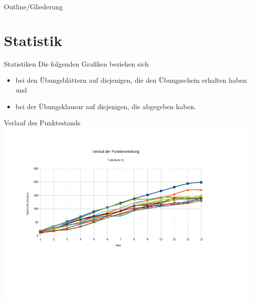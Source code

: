 
\subtitle{Foliensatz 14}
\date{7. Februar 2013}

\newcommand{\sq}{$\square$}
\newcommand{\da}{$\downarrow$}
\DeclareMathOperator{\cod}{cod}



\begin{frame}
    \titlepage
\end{frame}

\begin{frame}{Outline/Gliederung}
    \tableofcontents
\end{frame}

\section{Statistik}
\begin{frame}{Statistiken}
    Die folgenden Grafiken beziehen sich
    \begin{itemize}
        \item bei den Übungsblättern auf diejenigen, die den Übungsschein erhalten haben und
        \item bei der Übungsklausur auf diejenigen, die abgegeben haben.
    \end{itemize}
\end{frame}
\begin{frame}{Verlauf des Punktestands}
    \includegraphics[scale=0.4]{graphics/14/punkte1.pdf}
\end{frame}
